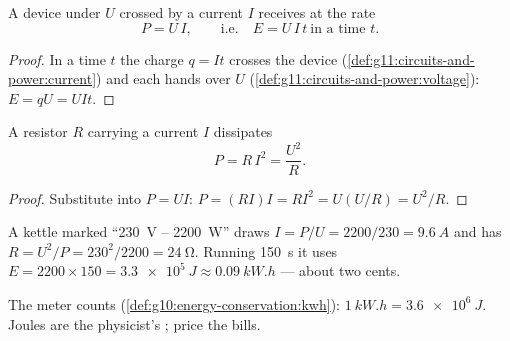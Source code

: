 \begin{proposition}\label{prop:g11:circuits-and-power:power}
A device under  $U$ crossed by a current $I$ receives  at
the rate
\[ P = U\,I , \qquad\text{i.e.}\quad E = U\,I\,t \ \text{in a time } t . \]
\end{proposition}

\begin{proof}
In a time $t$ the charge $q = It$ crosses the device
(\cref{def:g11:circuits-and-power:current}) and each  hands over
$U$  (\cref{def:g11:circuits-and-power:voltage}): $E = qU = UIt$.
\end{proof}

\begin{proposition}\label{prop:g11:circuits-and-power:ri2}
A resistor $R$ carrying a current $I$ dissipates
\[ P = R\,I^2 = \frac{U^2}{R} . \]
\end{proposition}

\begin{proof}
Substitute  into $P = UI$: $P = (RI)I = RI^2 = U(U/R) = U^2/R$.
\end{proof}

\begin{example}\label{ex:g11:circuits-and-power:nameplate}
A kettle marked ``\qty{230}{V} -- \qty{2200}{W}'' draws $I = P/U =
2200/230 = \qty{9.6}{A}$ and has  $R = U^2/P = 230^2/2200 =
\qty{24}{\ohm}$. Running \qty{150}{s} it uses $E = 2200 \times 150 =
\qty{3.3e5}{J} \approx \qty{0.09}{kW.h}$ --- about two cents.
\end{example}

\begin{remark}\label{rem:g11:circuits-and-power:kwh}
The meter counts  (\cref{def:g10:energy-conservation:kwh}):
$\qty{1}{kW.h} = \qty{3.6e6}{J}$. Joules are the physicist's ;
 price the bills.
\end{remark}

